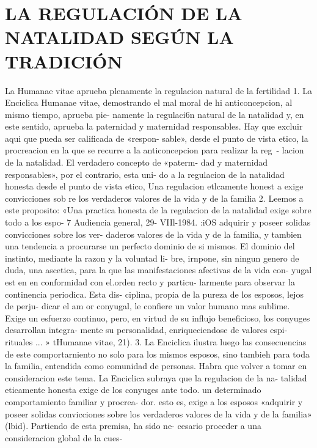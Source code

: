 \documentclass[letterpaper]{report}
\begin{document}
	{\centering
		\section{LA REGULACI\'ON DE LA NATALIDAD SEG\'UN LA TRADICI\'ON}
	}
	La Humanae vitae aprueba plenamente la regulacion 
natural de la fertilidad 
1. La Enciclica Humanae vitae, demostrando el mal 
moral de hi anticoncepcion, al mismo tiempo, aprueba pie- 
namente la regulaci6n natural de la natalidad y, en este 
sentido, aprueba la paternidad y maternidad responsables. 
Hay que excluir aqui que pueda ser calificada de «respon- 
sable», desde el punto de vista etico, la procreacion en la 
que se recurre a la anticoncepcion para realizar la reg~- 
lacion de la natalidad. El verdadero concepto de «paterm- 
dad y maternidad responsables», por el contrario, esta uni- 
do a la regulacion de la natalidad honesta desde el punto 
de vista etico, 
Una regulacion etlcamente honest a exige convicciones 
sob re los verdaderos valores de la vida y de la familia 
2. Leemos a este proposito: «Una practica honesta de 
la regulacion de la natalidad exige sobre todo a los espo- 
7 Audiencia general, 29- VIIl-1984.
:iOS adquirir y poseer solidas convicciones sobre los ver- 
daderos valores de la vida y de la familia, y tambien una 
tendencia a procurarse un perfecto dominio de si mismos. 
El dominio del instinto, mediante la razon y la voluntad li- 
bre, irnpone, sin ningun genero de duda, una ascetica, 
para la que las manifestaciones afectivas de la vida con- 
yugal est en en conformidad con el.orden recto y particu- 
larmente para observar la continencia periodica. Esta dis- 
ciplina, propia de la pureza de los esposos, lejos de perju- 
dicar el am or conyugal, le confiere un valor humano mas 
sublime. Exige un esfuerzo continuo, pero, en virtud de 
su influjo beneficioso, los conyuges desarrollan integra- 
mente su personalidad, enriqueciendose de valores espi- 
rituales ... » tHumanae vitae, 21). 
3. La Enciclica ilustra luego las consecuencias de este 
comportarniento no solo para los mismos esposos, sino 
tambieh para toda la familia, entendida como comunidad 
de personas. Habra que volver a tomar en consideracion 
este tema. La Enciclica subraya que la regulacion de la na- 
talidad eticamente honesta exige de los conyuges ante 
todo. un determinado comportamiento familiar y procrea- 
dor. esto es, exige a los esposos «adquirir y poseer solidas 
convicciones sobre los verdaderos valores de la vida y de 
la familia» (lbid). Partiendo de esta premisa, ha sido ne- 
cesario proceder a una consideracion global de la cues- 
\end{document}
